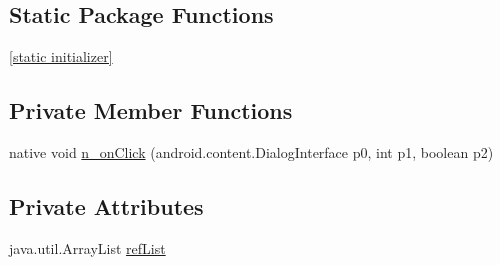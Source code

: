 \subsection*{Static Package Functions}
\begin{CompactItemize}
\item 
\hyperlink{classandroid_1_1support_1_1v7_1_1app_1_1_alert_dialog___i_dialog_interface_on_multi_choice_click_listener_implementor_198b9b2c0519dab7a36527e6ed2266fc}{\mbox{[}static initializer\mbox{]}}
\end{CompactItemize}
\subsection*{Private Member Functions}
\begin{CompactItemize}
\item 
native void \hyperlink{classandroid_1_1support_1_1v7_1_1app_1_1_alert_dialog___i_dialog_interface_on_multi_choice_click_listener_implementor_0cd1dc4724c14ec09a9f47b1d001e283}{n\_\-onClick} (android.content.DialogInterface p0, int p1, boolean p2)
\end{CompactItemize}
\subsection*{Private Attributes}
\begin{CompactItemize}
\item 
java.util.ArrayList \hyperlink{classandroid_1_1support_1_1v7_1_1app_1_1_alert_dialog___i_dialog_interface_on_multi_choice_click_listener_implementor_0d90f4d074fc47dde0a5334588fcc147}{refList}
\end{CompactItemize}


